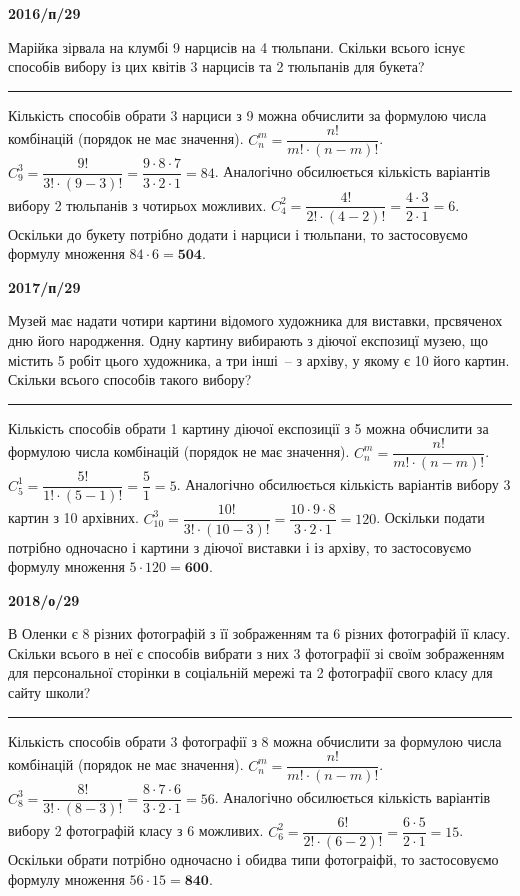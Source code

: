 \documentclass[12pt,a4paper]{article}  %
\begin{document}
\vspace{20pt}
\par\medskip \textbf{2016/п/29}\par
Марійка зірвала на клумбі 9 нарцисів на 4 тюльпани. Скільки всього існує способів вибору із цих квітів 3 нарцисів та 2 тюльпанів для букета?

\noindent\rule[0.5ex]{\linewidth}{1pt}
Кількість способів обрати 3 нарциси з 9 можна обчислити за формулою числа комбінацій (порядок не має значення).
$C_n^m=\dfrac{n!}{m!\cdot(n-m)!}$.
$C_{9}^3=\dfrac{9!}{3!\cdot(9-3)!}=\dfrac{9\cdot8\cdot7}{3\cdot2\cdot1}=84$.
Аналогічно обсилюється кількість варіантів вибору 2 тюльпанів з чотирьох можливих.
$C_{4}^2=\dfrac{4!}{2!\cdot(4-2)!}=\dfrac{4\cdot3}{2\cdot1}=6$.
Оскільки до букету потрібно додати і нарциси і тюльпани, то застосовуємо формулу множення $84\cdot6=\textbf{504}$.

\vspace{20pt}
\par\medskip \textbf{2017/п/29}\par
Музей має надати чотири картини відомого художника для виставки, прсвяченох дню його народження. Одну картину вибирають з діючої експозицї музею, що містить 5 робіт цього художника, а три інші~-- з архіву, у якому є 10 його картин. Скільки всього способів такого вибору?

\noindent\rule[0.5ex]{\linewidth}{1pt}
Кількість способів обрати 1 картину діючої експозиції з 5 можна обчислити за формулою числа комбінацій (порядок не має значення).
$C_n^m=\dfrac{n!}{m!\cdot(n-m)!}$.
$C_{5}^1=\dfrac{5!}{1!\cdot(5-1)!}=\dfrac{5}{1}=5$.
Аналогічно обсилюється кількість варіантів вибору 3 картин з 10 архівних.
$C_{10}^3=\dfrac{10!}{3!\cdot(10-3)!}=\dfrac{10\cdot9\cdot8}{3\cdot2\cdot1}=120$.
Оскільки подати потрібно одночасно і картини з діючої виставки і із архіву, то застосовуємо формулу множення $5\cdot120=\textbf{600}$.

\vspace{20pt}
\par\medskip \textbf{2018/о/29}\par
В Оленки є 8 різних фотографій з її зображенням та 6 різних фотографій її класу. Скільки всього в неї є способів вибрати з них 3 фотографії зі своїм зображенням для персональної сторінки в соціальній мережі та 2 фотографії свого класу для сайту школи?

\noindent\rule[0.5ex]{\linewidth}{1pt}
Кількість способів обрати 3 фотографії з 8 можна обчислити за формулою числа комбінацій (порядок не має значення).
$C_n^m=\dfrac{n!}{m!\cdot(n-m)!}$.
$C_{8}^3=\dfrac{8!}{3!\cdot(8-3)!}=\dfrac{8\cdot7\cdot6}{3\cdot2\cdot1}=56$.
Аналогічно обсилюється кількість варіантів вибору 2 фотографій класу з 6 можливих.
$C_{6}^2=\dfrac{6!}{2!\cdot(6-2)!}=\dfrac{6\cdot5}{2\cdot1}=15$.
Оскільки обрати потрібно одночасно і обидва типи фотограіфй, то застосовуємо формулу множення $56\cdot15=\textbf{840}$.
\end{document}
